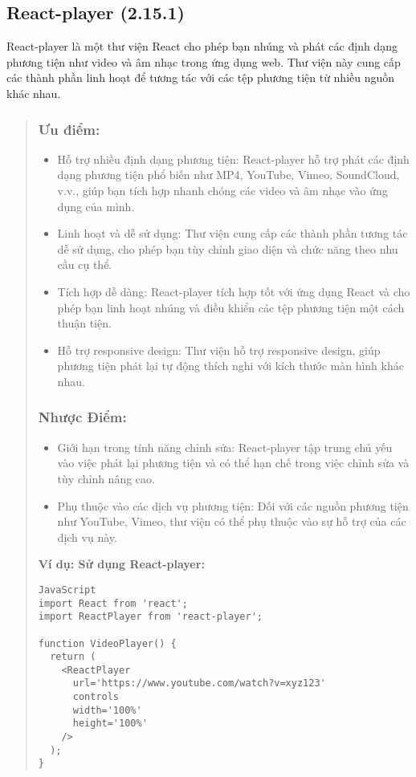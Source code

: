 \subsection{React-player (2.15.1)}

React-player là một thư viện React cho phép bạn nhúng và phát các định dạng phương tiện như video và âm nhạc trong ứng dụng web. Thư viện này cung cấp các thành phần linh hoạt để tương tác với các tệp phương tiện từ nhiều nguồn khác nhau.

\begin{quote}
\subsubsection{Ưu điểm:}
\begin{itemize}
  \item Hỗ trợ nhiều định dạng phương tiện: React-player hỗ trợ phát các định dạng phương tiện phổ biến như MP4, YouTube, Vimeo, SoundCloud, v.v., giúp bạn tích hợp nhanh chóng các video và âm nhạc vào ứng dụng của mình.
  \item Linh hoạt và dễ sử dụng: Thư viện cung cấp các thành phần tương tác dễ sử dụng, cho phép bạn tùy chỉnh giao diện và chức năng theo nhu cầu cụ thể.
  \item Tích hợp dễ dàng: React-player tích hợp tốt với ứng dụng React và cho phép bạn linh hoạt nhúng và điều khiển các tệp phương tiện một cách thuận tiện.
  \item Hỗ trợ responsive design: Thư viện hỗ trợ responsive design, giúp phương tiện phát lại tự động thích nghi với kích thước màn hình khác nhau.
\end{itemize}

\subsubsection{Nhược Điểm:}
\begin{itemize}
  \item Giới hạn trong tính năng chỉnh sửa: React-player tập trung chủ yếu vào việc phát lại phương tiện và có thể hạn chế trong việc chỉnh sửa và tùy chỉnh nâng cao.
  \item Phụ thuộc vào các dịch vụ phương tiện: Đối với các nguồn phương tiện như YouTube, Vimeo, thư viện có thể phụ thuộc vào sự hỗ trợ của các dịch vụ này.
\end{itemize}

\textbf{Ví dụ: Sử dụng React-player:}
\begin{lstlisting}
JavaScript
import React from 'react';
import ReactPlayer from 'react-player';

function VideoPlayer() {
  return (
    <ReactPlayer
      url='https://www.youtube.com/watch?v=xyz123'
      controls
      width='100%'
      height='100%'
    />
  );
}
\end{lstlisting}
\end{quote}




